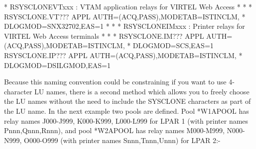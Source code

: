 \documentclass[letterpaper,10pt,english]{sphinxmanual}
\begin{document}
\begin{sphinxVerbatim}[commandchars=\\\{\}]
* R\PYGZam{}SYSCLONEVTxxx : VTAM application relays for VIRTEL Web Access    *
* \PYGZhy{}\PYGZhy{}\PYGZhy{}\PYGZhy{}\PYGZhy{}\PYGZhy{}\PYGZhy{}\PYGZhy{}\PYGZhy{}\PYGZhy{}\PYGZhy{}\PYGZhy{}\PYGZhy{}\PYGZhy{}\PYGZhy{}\PYGZhy{}\PYGZhy{}\PYGZhy{}\PYGZhy{}\PYGZhy{}\PYGZhy{}\PYGZhy{}\PYGZhy{}\PYGZhy{}\PYGZhy{}\PYGZhy{}\PYGZhy{}\PYGZhy{}\PYGZhy{}\PYGZhy{}\PYGZhy{}\PYGZhy{}\PYGZhy{}\PYGZhy{}\PYGZhy{}\PYGZhy{}\PYGZhy{}\PYGZhy{}\PYGZhy{}\PYGZhy{}\PYGZhy{}\PYGZhy{}\PYGZhy{}\PYGZhy{}\PYGZhy{}\PYGZhy{}\PYGZhy{}\PYGZhy{}\PYGZhy{}\PYGZhy{}\PYGZhy{}\PYGZhy{}\PYGZhy{}\PYGZhy{}\PYGZhy{}\PYGZhy{}\PYGZhy{}\PYGZhy{}\PYGZhy{}\PYGZhy{}\PYGZhy{}\PYGZhy{}\PYGZhy{}\PYGZhy{}\PYGZhy{}\PYGZhy{} *
R\PYGZam{}SYSCLONE.VT??? APPL AUTH=(ACQ,PASS),MODETAB=ISTINCLM,               *
      DLOGMOD=SNX32702,EAS=1
* \PYGZhy{}\PYGZhy{}\PYGZhy{}\PYGZhy{}\PYGZhy{}\PYGZhy{}\PYGZhy{}\PYGZhy{}\PYGZhy{}\PYGZhy{}\PYGZhy{}\PYGZhy{}\PYGZhy{}\PYGZhy{}\PYGZhy{}\PYGZhy{}\PYGZhy{}\PYGZhy{}\PYGZhy{}\PYGZhy{}\PYGZhy{}\PYGZhy{}\PYGZhy{}\PYGZhy{}\PYGZhy{}\PYGZhy{}\PYGZhy{}\PYGZhy{}\PYGZhy{}\PYGZhy{}\PYGZhy{}\PYGZhy{}\PYGZhy{}\PYGZhy{}\PYGZhy{}\PYGZhy{}\PYGZhy{}\PYGZhy{}\PYGZhy{}\PYGZhy{}\PYGZhy{}\PYGZhy{}\PYGZhy{}\PYGZhy{}\PYGZhy{}\PYGZhy{}\PYGZhy{}\PYGZhy{}\PYGZhy{}\PYGZhy{}\PYGZhy{}\PYGZhy{}\PYGZhy{}\PYGZhy{}\PYGZhy{}\PYGZhy{}\PYGZhy{}\PYGZhy{}\PYGZhy{}\PYGZhy{}\PYGZhy{}\PYGZhy{}\PYGZhy{}\PYGZhy{}\PYGZhy{}\PYGZhy{} *
* R\PYGZam{}SYSCLONEIMxxx : Printer relays for VIRTEL Web Access terminals   *
* \PYGZhy{}\PYGZhy{}\PYGZhy{}\PYGZhy{}\PYGZhy{}\PYGZhy{}\PYGZhy{}\PYGZhy{}\PYGZhy{}\PYGZhy{}\PYGZhy{}\PYGZhy{}\PYGZhy{}\PYGZhy{}\PYGZhy{}\PYGZhy{}\PYGZhy{}\PYGZhy{}\PYGZhy{}\PYGZhy{}\PYGZhy{}\PYGZhy{}\PYGZhy{}\PYGZhy{}\PYGZhy{}\PYGZhy{}\PYGZhy{}\PYGZhy{}\PYGZhy{}\PYGZhy{}\PYGZhy{}\PYGZhy{}\PYGZhy{}\PYGZhy{}\PYGZhy{}\PYGZhy{}\PYGZhy{}\PYGZhy{}\PYGZhy{}\PYGZhy{}\PYGZhy{}\PYGZhy{}\PYGZhy{}\PYGZhy{}\PYGZhy{}\PYGZhy{}\PYGZhy{}\PYGZhy{}\PYGZhy{}\PYGZhy{}\PYGZhy{}\PYGZhy{}\PYGZhy{}\PYGZhy{}\PYGZhy{}\PYGZhy{}\PYGZhy{}\PYGZhy{}\PYGZhy{}\PYGZhy{}\PYGZhy{}\PYGZhy{}\PYGZhy{}\PYGZhy{}\PYGZhy{}\PYGZhy{} *
R\PYGZam{}SYSCLONE.IM??? APPL AUTH=(ACQ,PASS),MODETAB=ISTINCLM,               *
      DLOGMOD=SCS,EAS=1
R\PYGZam{}SYSCLONE.IP??? APPL AUTH=(ACQ,PASS),MODETAB=ISTINCLM,               *
      DLOGMOD=DSILGMOD,EAS=1
\end{sphinxVerbatim}

Because this naming convention could be constraining if you want to use 4-character LU names, there is a second method which allows you to freely choose the LU names without the need to include the SYSCLONE characters as part of the LU name. In the next example two pools are defined. Pool *W1APOOL has relay names J000-J999, K000-K999, L000-L999 for LPAR 1 (with printer names Pnnn,Qnnn,Rnnn), and pool *W2APOOL has relay names M000-M999, N000-N999, O000-O999 (with printer names Snnn,Tnnn,Unnn) for LPAR 2:-
\end{document}
